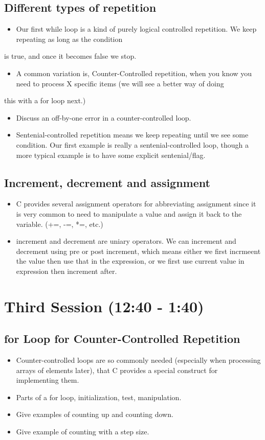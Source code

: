\documentclass[11pt]{article}
\begin{document}
\subsection{Different types of repetition}
\label{sec-2-5}
\begin{itemize}
\item Our first while loop is a kind of purely logical controlled repetition.  We keep repeating as long as the condition
\end{itemize}
is true, and once it becomes false we stop.
\begin{itemize}
\item A common variation is, Counter-Controlled repetition, when you know you need to process X specific items (we will see a better way of doing
\end{itemize}
this with a for loop next.)
\begin{itemize}
\item Discuss an off-by-one error in a counter-controlled loop.
\item Sentenial-controlled repetition means we keep repeating until we see
some condition.  Our first example is really a sentenial-controlled
loop, though a more typical example is to have some explicit
sentenial/flag.
\end{itemize}

\subsection{Increment, decrement and assignment}
\label{sec-2-6}
\begin{itemize}
\item C provides several assignment operators for abbreviating
assignment since it is very common to need to manipulate a value and
assign it back to the variable. (+=, -=, *=, etc.)
\item increment and decrement are uniary operators.  We can increment and
decrement using pre or post increment, which means either we first
incrmeent the value then use that in the expression, or we first use
current value in expression then increment after.
\end{itemize}
\section{Third Session (12:40 - 1:40)}
\label{sec-3}

\subsection{for Loop for Counter-Controlled Repetition}
\label{sec-3-1}
\begin{itemize}
\item Counter-controlled loops are so commonly needed (especially when
processing arrays of elements later), that C provides a special
construct for implementing them.
\item Parts of a for loop, initialization, test, manipulation.
\item Give examples of counting up and counting down.
\item Give example of counting with a step size.
\end{itemize}
\end{document}
